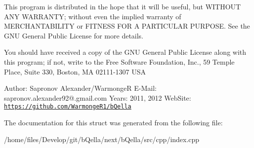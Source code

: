 This program is distributed in the hope that it will be useful, but WITHOUT ANY WARRANTY; without even the implied warranty of MERCHANTABILITY or FITNESS FOR A PARTICULAR PURPOSE. See the GNU General Public License for more details.

You should have received a copy of the GNU General Public License along with this program; if not, write to the Free Software Foundation, Inc., 59 Temple Place, Suite 330, Boston, MA 02111-\/1307 USA

Author: Sapronov Alexander/WarmongeR E-\/Mail: sapronov.alexander92@.gmail.com Years: 2011, 2012 WebSite: \href{https://github.com/WarmongeR1/bQella}{\tt https://github.com/WarmongeR1/bQella} 

The documentation for this struct was generated from the following file:\begin{DoxyCompactItemize}
\item 
/home/files/Develop/git/bQella/next/bQella/src/cpp/index.cpp\end{DoxyCompactItemize}
